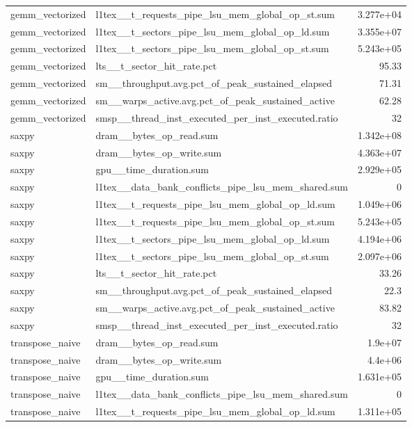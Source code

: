 \begin{longtable}{llr}
gemm\_vectorized & l1tex\_\_t\_requests\_pipe\_lsu\_mem\_global\_op\_st.sum & 3.277e+04 \\
gemm\_vectorized & l1tex\_\_t\_sectors\_pipe\_lsu\_mem\_global\_op\_ld.sum & 3.355e+07 \\
gemm\_vectorized & l1tex\_\_t\_sectors\_pipe\_lsu\_mem\_global\_op\_st.sum & 5.243e+05 \\
gemm\_vectorized & lts\_\_t\_sector\_hit\_rate.pct & 95.33 \\
gemm\_vectorized & sm\_\_throughput.avg.pct\_of\_peak\_sustained\_elapsed & 71.31 \\
gemm\_vectorized & sm\_\_warps\_active.avg.pct\_of\_peak\_sustained\_active & 62.28 \\
gemm\_vectorized & smsp\_\_thread\_inst\_executed\_per\_inst\_executed.ratio & 32 \\
saxpy & dram\_\_bytes\_op\_read.sum & 1.342e+08 \\
saxpy & dram\_\_bytes\_op\_write.sum & 4.363e+07 \\
saxpy & gpu\_\_time\_duration.sum & 2.929e+05 \\
saxpy & l1tex\_\_data\_bank\_conflicts\_pipe\_lsu\_mem\_shared.sum & 0 \\
saxpy & l1tex\_\_t\_requests\_pipe\_lsu\_mem\_global\_op\_ld.sum & 1.049e+06 \\
saxpy & l1tex\_\_t\_requests\_pipe\_lsu\_mem\_global\_op\_st.sum & 5.243e+05 \\
saxpy & l1tex\_\_t\_sectors\_pipe\_lsu\_mem\_global\_op\_ld.sum & 4.194e+06 \\
saxpy & l1tex\_\_t\_sectors\_pipe\_lsu\_mem\_global\_op\_st.sum & 2.097e+06 \\
saxpy & lts\_\_t\_sector\_hit\_rate.pct & 33.26 \\
saxpy & sm\_\_throughput.avg.pct\_of\_peak\_sustained\_elapsed & 22.3 \\
saxpy & sm\_\_warps\_active.avg.pct\_of\_peak\_sustained\_active & 83.82 \\
saxpy & smsp\_\_thread\_inst\_executed\_per\_inst\_executed.ratio & 32 \\
transpose\_naive & dram\_\_bytes\_op\_read.sum & 1.9e+07 \\
transpose\_naive & dram\_\_bytes\_op\_write.sum & 4.4e+06 \\
transpose\_naive & gpu\_\_time\_duration.sum & 1.631e+05 \\
transpose\_naive & l1tex\_\_data\_bank\_conflicts\_pipe\_lsu\_mem\_shared.sum & 0 \\
transpose\_naive & l1tex\_\_t\_requests\_pipe\_lsu\_mem\_global\_op\_ld.sum & 1.311e+05 \\

\end{longtable}
